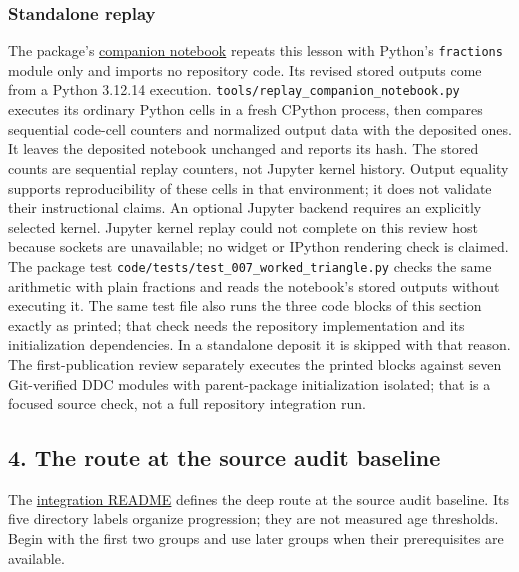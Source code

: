 \documentclass[
  11pt,
]{article}
\newcommand{\passthrough}[1]{#1}
\begin{document}
\hypertarget{standalone-replay}{%
\subsubsection{Standalone replay}\label{standalone-replay}}

The package's
\href{jupyter_notebooks/007_moving_a_discrepancy.ipynb}{companion
notebook} repeats this lesson with Python's
\passthrough{\lstinline!fractions!} module only and imports no
repository code. Its revised stored outputs come from a Python 3.12.14
execution.
\texttt{\nolinkurl{tools/replay_companion_notebook.py}} executes
its ordinary Python cells in a fresh CPython process, then compares
sequential code-cell counters and normalized output data with the
deposited ones. It leaves the deposited notebook unchanged and reports
its hash. The stored counts are sequential replay counters, not Jupyter
kernel history. Output equality supports reproducibility of these cells
in that environment; it does not validate their instructional claims. An
optional Jupyter backend requires an explicitly selected kernel. Jupyter
kernel replay could not complete on this review host because sockets are
unavailable; no widget or IPython rendering check is claimed. The
package test
\texttt{\nolinkurl{code/tests/test_007_worked_triangle.py}}
checks the same arithmetic with plain fractions and reads the notebook's
stored outputs without executing it. The same test file also runs the
three code blocks of this section exactly as printed; that check needs
the repository implementation and its initialization dependencies. In a
standalone deposit it is skipped with that reason. The first-publication
review separately executes the printed blocks against seven Git-verified
DDC modules with parent-package initialization isolated; that is a
focused source check, not a full repository integration run.

\hypertarget{the-route-at-the-source-audit-baseline}{%
\subsection{4. The route at the source audit
baseline}\label{the-route-at-the-source-audit-baseline}}

The
\href{https://github.com/dbccpage/the_symbol_game/blob/52cb5457f6c485ba548cfd292f6012a941ed22cf/education/the_symbol_game/lessons/system_integration/README.md}{integration
README} defines the deep route at the source audit baseline. Its five
directory labels organize progression; they are not measured age
thresholds. Begin with the first two groups and use later groups when
their prerequisites are available.
\end{document}
